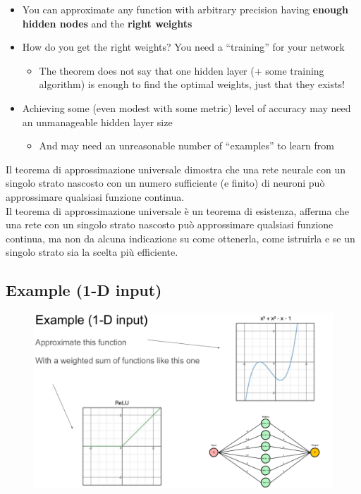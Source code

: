 \begin{itemize}
	\item You can approximate any function with arbitrary precision having \textbf{enough hidden nodes} and the \textbf{right weights}
	\item How do you get the right weights? You need a “training” for your network
	\begin{itemize}
		\item The theorem does not say that one hidden layer (+ some training algorithm) is enough to find the optimal weights, just that they exists!
	\end{itemize}
	\item Achieving some (even modest with some metric) level of accuracy may need an unmanageable hidden layer size
	\begin{itemize}
		\item And may need an unreasonable number of “examples” to learn from
	\end{itemize}
\end{itemize}

\begin{tcolorbox}[width=\textwidth,colback={white},title={\textbf{17.} What is the universal approximation theorem and why “depth” is relevant despite the theorem? },colbacktitle=red,coltitle=black]
Il teorema di approssimazione universale dimostra che una rete neurale con un singolo strato nascosto con un numero sufficiente (e finito) di neuroni può approssimare qualsiasi funzione continua.\\

Il teorema di approssimazione universale è un teorema di esistenza, afferma che una rete con un singolo strato nascosto può approssimare qualsiasi funzione continua, ma non da alcuna indicazione su come ottenerla, come istruirla e se un singolo strato sia la scelta più efficiente. 
\end{tcolorbox}

\subsection{Example (1-D input)}

\begin{figure}[ht]
	\centering
	\includegraphics[width=0.9\linewidth]{figure_ml/example1d.png}
\end{figure}
\FloatBarrier

